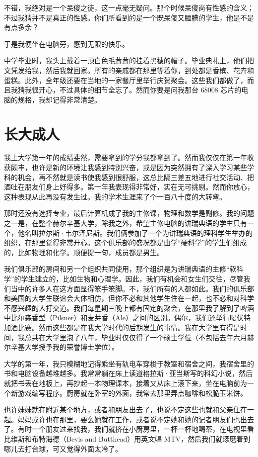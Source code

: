 不错，我绝对是一个呆傻之徒，这一点毫无疑问。那个时候呆傻尚有性感的含义；不过我猜并不是真正的性感。你们所看到的是一个既呆傻又腼腆的学生，他是不是有点多余？

于是我便坐在电脑旁，感到无限的快乐。

中学毕业时，我头上戴着一顶白色毛茸茸的挂着黑穗的帽子。毕业典礼上，他们把文凭发给我，然后我就回家。所有的亲戚都在那里等着你，到处都是香槟、花卉和蛋糕。此外，全年级还要在当地的一家餐厅里举行庆贺聚会。这些我们都做了，而且我猜我很开心，不过具体的细节全忘了。然而你要是问我那台 68008 芯片的电脑的规格，我却记得非常清楚。

 
\section{长大成人}

我上大学第一年的成绩斐然，需要拿到的学分我都拿到了。然而我仅仅在第一年收获颇丰，也许是新的环境让我感到特别兴奋，或是因为突然拥有了深入学习某些学科的机会，再不然就是读书使我感到很舒服，这总比隔三差五地进行社交活动、把酒吐在朋友们身上好得多。第一年我表现得非常好，实在无可挑剔。然而你放心，这种表现从此再没有发生过。我的学术生涯来了个一百八十度的大转弯。

那时还没有选择专业，最后计算机成了我的主修课，物理和数学是副修。我的问题之一是，在整个赫尔辛基大学，除我之外，希望主修电脑的讲瑞典语的学生只有一个，他名叫拉尔斯·韦尔泽尼斯。我们俩参加了一个为讲瑞典语的理科学生举办的组织，在那里觉得非常开心。这个俱乐部的盛况都是由学“硬科学”的学生们组成的，比如物理和化学。顺便提一句，成员都是男生。

我们俱乐部的房间和另一个组织共同使用，那个组织是为讲瑞典语的主修“软科学”的学生建立的，比如生物和心理学。因此，我们有机会和女生们交往，尽管我们当中的许多人在这方面显得笨手笨脚。不，我们所有的人都如此。我们的俱乐部和美国的大学生联谊会大体相仿，但你不必和其他学生住在一起，也不必和对科学不感兴趣的人打交道。我们每星期三晚上都有固定的聚会，在那里我了解到了啤酒中比尔森香型（Pilsner）和麦芽香（Ale）之间的区别。偶尔，我们还举行喝伏特加酒比赛。然而这些都是在我大学时代的后期发生的事情。我在大学里有得是时间，我总共在大学里泡了八年，毕业时仅仅得了一个硕士学位（不包括去年六月赫尔辛基大学授予我的荣誉博士学位）。

大学的第一年，我只模糊地记得乘坐有轨电车穿梭于教室和宿舍之间，我宿舍里的书和电脑设备越堆越多。我常常躺在床上读道格拉斯·亚当斯写的科幻小说，然后就把书丢在地板上，再抄起一本物理课本，接着又从床上滚下来，坐在电脑前为一个新游戏编写程序。厨房就在卧室的外面，我常去那里弄点咖啡和松脆玉米饼。

也许妹妹就在附近某个地方，或者和朋友出去了，也说不定这些也就和父亲住在一起。妈妈或许也在那里，要么她就在工作，或者说不定她和她的记者朋友们也出去了。有时一个朋友过来找我，我们就挤在小厨房里，一杯一杯地喝茶，在电视里看比维斯和布特海德（Bevis and Butthead）用英文唱 MTV，然后我们就琢磨着到哪儿去打台球，可又觉得外面太冷了。


